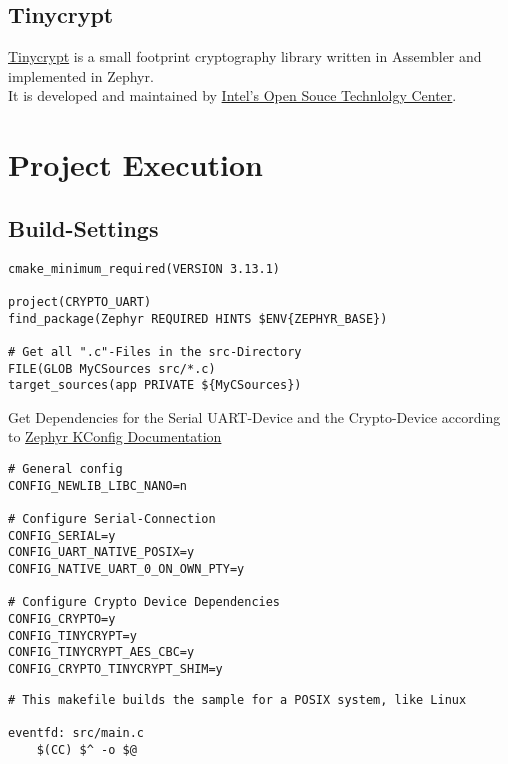 \subsection{Tinycrypt}

\href{https://01.org/tinycrypt}
{Tinycrypt} is a small footprint cryptography library written
in Assembler and implemented in Zephyr.
\\
It is developed and maintained by
\href{https://01.org/}
{Intel's Open Souce Technlolgy Center}.

\pagebreak

\section{Project Execution}

\subsection{Build-Settings}

\begin{lstlisting}[caption=CMakelists.txt]
cmake_minimum_required(VERSION 3.13.1)

project(CRYPTO_UART)
find_package(Zephyr REQUIRED HINTS $ENV{ZEPHYR_BASE})

# Get all ".c"-Files in the src-Directory
FILE(GLOB MyCSources src/*.c)
target_sources(app PRIVATE ${MyCSources})
\end{lstlisting}

Get Dependencies for the Serial UART-Device and the Crypto-Device
according to
\href{https://docs.zephyrproject.org/2.4.0/reference/kconfig/index-all.html}
{Zephyr KConfig Documentation}

\begin{lstlisting}[caption=prj.conf]
# General config
CONFIG_NEWLIB_LIBC_NANO=n

# Configure Serial-Connection
CONFIG_SERIAL=y
CONFIG_UART_NATIVE_POSIX=y
CONFIG_NATIVE_UART_0_ON_OWN_PTY=y

# Configure Crypto Device Dependencies
CONFIG_CRYPTO=y
CONFIG_TINYCRYPT=y
CONFIG_TINYCRYPT_AES_CBC=y
CONFIG_CRYPTO_TINYCRYPT_SHIM=y
\end{lstlisting}

\begin{lstlisting}[caption=Makefile.posix]
# This makefile builds the sample for a POSIX system, like Linux

eventfd: src/main.c
	$(CC) $^ -o $@
\end{lstlisting}

